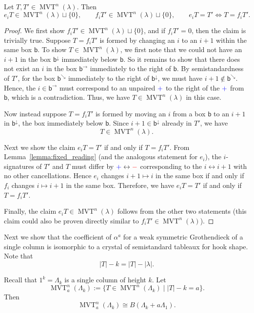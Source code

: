 \documentclass[ALCO,ThmDefs,Unicode,epreuves]{cedram}
\newcommand{\iso}{\cong}
\newcommand{\bbb}{\mathsf{b}}
\newcommand{\abs}[1]{\lvert #1 \rvert}
\DeclareMathOperator{\mvt}{MVT} %
\newcommand{\bplus}{{\color{blue}+}}
\newcommand{\bminus}{{\color{red}-}}
\begin{document}
\begin{lemma}
\label{lemma:mvt_ops_well_defined}
Let $T, T' \in \mvt^n(\lambda)$. Then
\[
e_i T \in \mvt^n(\lambda) \sqcup \{0\},
\qquad
f_i T' \in \mvt^n(\lambda) \sqcup \{0\},
\qquad
e_i T = T' \Longleftrightarrow T = f_i T'.
\]
\end{lemma}

\begin{proof}
We first show $f_i T' \in \mvt^n(\lambda) \sqcup \{0\}$, and if $f_i T' = 0$, then the claim is trivially true.
Suppose $T = f_i T'$ is formed by changing an $i$ to an $i+1$ within the same box $\bbb$. To show $T \in \mvt^n(\lambda)$, we first note that we could not have an $i+1$ in the box $\bbb^{\downarrow}$ immediately below $\bbb$. So it remains to show that there does not exist an $i$ in the box $\bbb^{\rightarrow}$ immediately to the right of $\bbb$. By semistandardness of $T'$, for the box $\bbb^{\searrow}$ immediately to the right of $\bbb^{\downarrow}$, we must have $i + 1 \notin \bbb^{\searrow}$. Hence, the $i \in \bbb^{\rightarrow}$ must correspond to an unpaired $\bplus$ to the right of the $\bplus$ from $\bbb$, which is a contradiction. Thus, we have $T \in \mvt^n(\lambda)$ in this case.

Now instead suppose $T = f_i T'$ is formed by moving an $i$ from a box $\bbb$ to an $i+1$ in $\bbb^{\downarrow}$, the box immediately below $\bbb$. Since $i+1 \in \bbb^{\downarrow}$ already in $T'$, we have 
\[
T \in \mvt^n(\lambda).
\]

Next we show the claim $e_i T = T'$ if and only if $T = f_i T'$.
From Lemma~\ref{lemma:fixed_reading} (and the analogous statement for $e_i$), the $i$-signatures of $T'$ and $T$ must differ by $\bplus \leftrightarrow \bminus$ corresponding to the $i \leftrightarrow i+1$ with no other cancellations. Hence $e_i$ changes $i+1 \mapsto i$ in the same box if and only if $f_i$ changes $i \mapsto i+1$ in the same box. Therefore, we have $e_i T = T'$ if and only if $T = f_i T'$.

Finally, the claim $e_i T \in \mvt^n(\lambda)$ follows from the other two statements (this claim could also be proven directly similar to $f_i T' \in \mvt^n(\lambda)$).
\end{proof}

Next we show that the coefficient of $\alpha^a$ for a weak symmetric Grothendieck of a single column is isomorphic to a crystal of semistandard tableaux for hook shape.
Note that 
\[
\abs{T} - k = \abs{T} - \abs{\lambda}.
\]

\begin{prop}
\label{prop:column_isomorphism}
Recall that $1^k = \Lambda_k$ is a single column of height $k$.
Let
\[
\mvt^n_a(\Lambda_k) := \{ T \in \mvt^n(\Lambda_k) \mid \abs{T} - k = a \}.
\]
Then
\[
\mvt^n_a(\Lambda_k) \iso B(\Lambda_k + a\Lambda_1).
\]
\end{prop}
\end{document}
